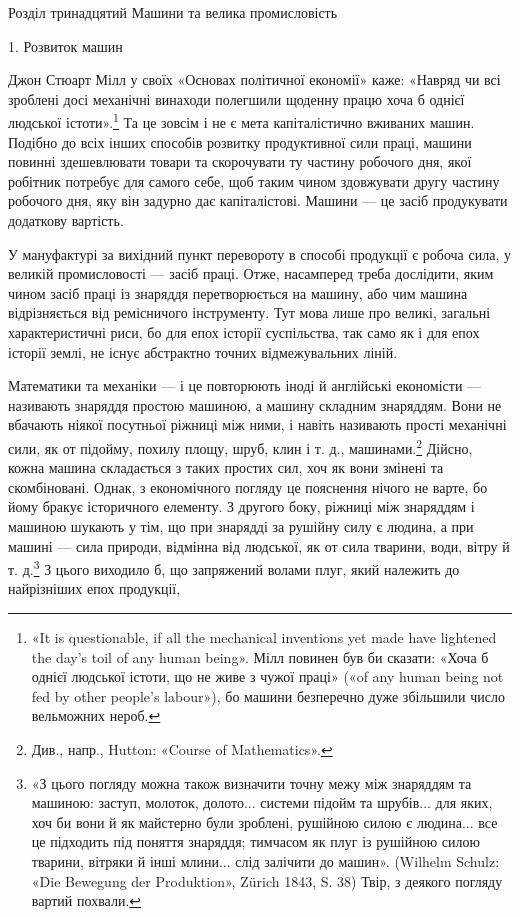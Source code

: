 Розділ тринадцятий
Машини та велика промисловість

1. Розвиток машин

Джон Стюарт Мілл у своїх «Основах політичної економії»
каже: «Навряд чи всі зроблені досі механічні винаходи полегшили
щоденну працю хоча б однієї людської істоти».\footnote{
«It is questionable, if all the mechanical inventions yet made have
lightened the day’s toil of any human being». Мілл повинен був би сказати:
«Хоча б однієї людської істоти, що не живе з чужої праці» («of any human
being not fed by other people’s labour»), бо машини безперечно дуже збільшили
число вельможних нероб.
} Та це
зовсім і не є мета капіталістично вживаних машин. Подібно до
всіх інших способів розвитку продуктивної сили праці, машини
повинні здешевлювати товари та скорочувати ту частину робочого
дня, якої робітник потребує для самого себе, щоб таким
чином здовжувати другу частину робочого дня, яку він задурно
дає капіталістові. Машини — це засіб продукувати додаткову
вартість.

У мануфактурі за вихідний пункт перевороту в способі продукції
є робоча сила, у великій промисловості — засіб праці.
Отже, насамперед треба дослідити, яким чином засіб праці із
знаряддя перетворюється на машину, або чим машина відрізняється
від ремісничого інструменту. Тут мова лише про великі,
загальні характеристичні риси, бо для епох історії суспільства,
так само як і для епох історії землі, не існує абстрактно точних
відмежувальних ліній.

Математики та механіки — і це повторюють іноді й англійські
економісти — називають знаряддя простою машиною, а машину
складним знаряддям. Вони не вбачають ніякої посутньої
ріжниці між ними, і навіть називають прості механічні сили,
як от підойму, похилу площу, шруб, клин і т. д., машинами.\footnote{
Див., напр., Hutton: «Course of Mathematics».
}
Дійсно, кожна машина складається з таких простих сил,
хоч як вони змінені та скомбіновані. Однак, з економічного погляду
це пояснення нічого не варте, бо йому бракує історичного
елементу. З другого боку, ріжниці між знаряддям і машиною
шукають у тім, що при знарядді за рушійну силу є людина, а
при машині — сила природи, відмінна від людської, як от сила
тварини, води, вітру й т. д.\footnote{
«З цього погляду можна також визначити точну межу між знаряддям
та машиною: заступ, молоток, долото... системи підойм та шрубів...
для яких, хоч би вони й як майстерно були зроблені, рушійною силою є
людина... все це підходить під поняття знаряддя; тимчасом як плуг із
рушійною силою тварини, вітряки й інші млини... слід залічити до машин».
(Wilhelm Schulz: «Die Bewegung der Produktion», Zürich 1843, S. 38)
Твір, з деякого погляду вартий похвали.
} З цього виходило б, що запряжений
волами плуг, який належить до найрізніших епох продукції,